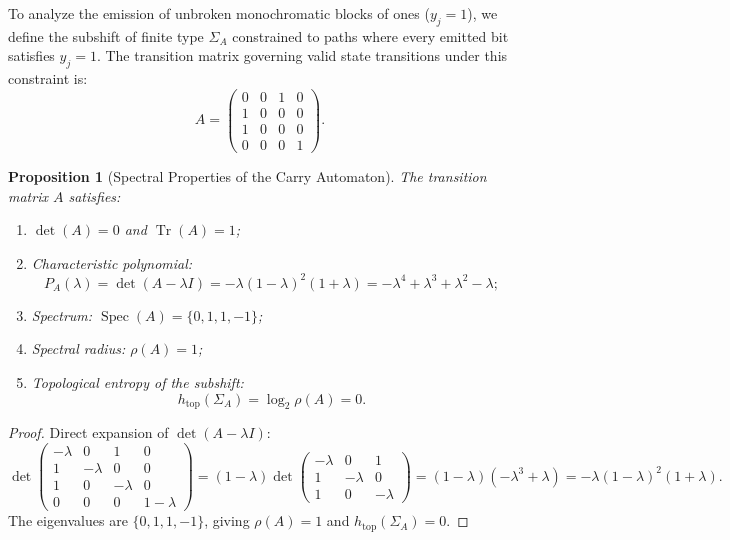 \documentclass[11pt,reqno]{amsart}
\newtheorem{proposition}[theorem]{Proposition}
\theoremstyle{definition}
\numberwithin{equation}{section}
\begin{document}
To analyze the emission of unbroken monochromatic blocks of ones ($y_j = 1$), we define the subshift of finite type $\Sigma_A$ constrained to paths where every emitted bit satisfies $y_j = 1$. The transition matrix governing valid state transitions under this constraint is:
\begin{equation}\label{eq:matrix_A}
A = \begin{pmatrix}
0 & 0 & 1 & 0 \\
1 & 0 & 0 & 0 \\
1 & 0 & 0 & 0 \\
0 & 0 & 0 & 1
\end{pmatrix}.
\end{equation}

\begin{proposition}[Spectral Properties of the Carry Automaton]\label{prop:spectral}
The transition matrix $A$ satisfies:
\begin{enumerate}
    \item $\det(A) = 0$ and $\operatorname{Tr}(A) = 1$;
    \item Characteristic polynomial:
    \begin{equation}
    P_A(\lambda) = \det(A - \lambda I) = -\lambda (1 - \lambda)^2 (1 + \lambda) = -\lambda^4 + \lambda^3 + \lambda^2 - \lambda;
    \end{equation}
    \item Spectrum: $\operatorname{Spec}(A) = \{0, 1, 1, -1\}$;
    \item Spectral radius: $\rho(A) = 1$;
    \item Topological entropy of the subshift:
    \begin{equation}
    h_{\mathrm{top}}(\Sigma_A) = \log_2 \rho(A) = 0.
    \end{equation}
\end{enumerate}
\end{proposition}

\begin{proof}
Direct expansion of $\det(A - \lambda I)$:
\[
\det \begin{pmatrix}
-\lambda & 0 & 1 & 0 \\
1 & -\lambda & 0 & 0 \\
1 & 0 & -\lambda & 0 \\
0 & 0 & 0 & 1 - \lambda
\end{pmatrix} = (1 - \lambda) \det \begin{pmatrix}
-\lambda & 0 & 1 \\
1 & -\lambda & 0 \\
1 & 0 & -\lambda
\end{pmatrix} = (1 - \lambda)(-\lambda^3 + \lambda) = -\lambda (1 - \lambda)^2 (1 + \lambda).
\]
The eigenvalues are $\{0, 1, 1, -1\}$, giving $\rho(A) = 1$ and $h_{\mathrm{top}}(\Sigma_A) = 0$.
\end{proof}
\end{document}
